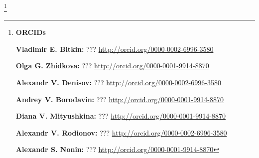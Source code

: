 \pagebreak





\thanks{{\bf ORCIDs}



{\bf Vladimir E. Bitkin:}  ???  \url{http://orcid.org/0000-0002-6996-3580}



{\bf Olga G. Zhidkova:}  ???  \url{http://orcid.org/0000-0001-9914-8870}



{\bf Alexandr V. Denisov:}  ???  \url{http://orcid.org/0000-0002-6996-3580}



{\bf Andrey V. Borodavin:}  ???  \url{http://orcid.org/0000-0001-9914-8870}



{\bf Diana V. Mityushkina:}  ???  \url{http://orcid.org/0000-0001-9914-8870}



{\bf Alexandr V. Rodionov:}  ???  \url{http://orcid.org/0000-0002-6996-3580}



{\bf Alexandr S. Nonin:}  ???  \url{http://orcid.org/0000-0001-9914-8870}



}





\EngRef


